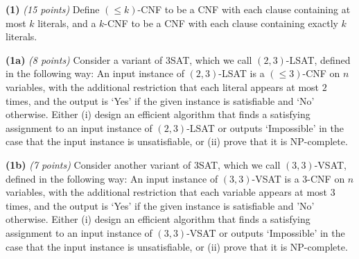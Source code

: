 \documentclass[12pt]{article}
\def\gap{0.1in}
\def\bigap{0.25in}
\begin{document}
\setlength{\parindent}{0in}
\addtolength{\parskip}{0.1cm}
\setlength{\fboxrule}{.5mm}\setlength{\fboxsep}{1.2mm}
\newlength{\boxlength}\setlength{\boxlength}{\textwidth}
\addtolength{\boxlength}{-4mm}
\begin{center}
\end{center}
\vspace{5mm}
\vskip \bigap
{\bf (1)} {\em (15 points)} Define $(\le k)$-CNF to be a CNF with each clause containing at most $k$ literals, and a $k$-CNF to be a CNF with each clause containing exactly $k$ literals.

{\bf (1a)} {\em (8 points)} Consider a  variant of 3SAT, which we call $(2,3)$-LSAT, defined in the following way: An input instance of $(2,3)$-LSAT is a $(\le 3)$-CNF on $n$ variables, with the additional restriction that each literal appears at most $2$ times, and the output is `Yes' if the given instance is satisfiable and `No' otherwise. Either (i) design an efficient algorithm that  finds a satisfying assignment to an input instance of $(2,3)$-LSAT or outputs `Impossible' in the case that the input instance is unsatisfiable, or  (ii) prove that it is NP-complete. 

\vskip \gap
 
{\bf (1b)} {\em (7 points)} Consider another  variant of 3SAT, which we call $(3,3)$-VSAT, defined in the following way: An input instance of $(3,3)$-VSAT is a $3$-CNF on $n$ variables, with the additional restriction that each variable appears at most $3$ times, and the output is  `Yes' if the given instance is satisfiable and 'No' otherwise.   Either (i) design an efficient algorithm that  finds a satisfying assignment to an input instance of $(3,3)$-VSAT or outputs `Impossible' in the case that the input instance is unsatisfiable, or  (ii) prove that it is NP-complete. 

\end{document}
